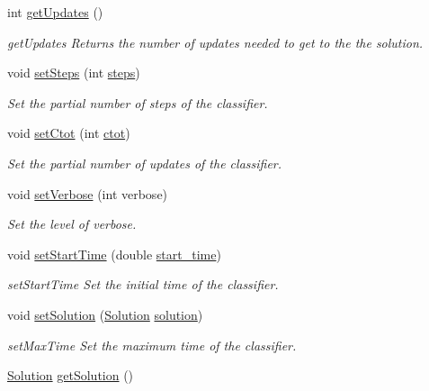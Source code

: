 \begin{DoxyCompactItemize}
int \hyperlink{class_classifier_a738c2fbed982db6cad02062edcc037e4}{get\+Updates} ()
\begin{DoxyCompactList}\small\item\em get\+Updates Returns the number of updates needed to get to the the solution. \end{DoxyCompactList}\item 
void \hyperlink{class_classifier_a779b6cac0351e272ee0573d919d5d060}{set\+Steps} (int \hyperlink{class_classifier_a1e4c9c9ba059d5aff1d4d81eb41725cb}{steps})
\begin{DoxyCompactList}\small\item\em Set the partial number of steps of the classifier. \end{DoxyCompactList}\item 
void \hyperlink{class_classifier_a3293d7d39c3934503a23b920f84f73e7}{set\+Ctot} (int \hyperlink{class_classifier_a99d9a7f504212bb3dc2726c10a2333c6}{ctot})
\begin{DoxyCompactList}\small\item\em Set the partial number of updates of the classifier. \end{DoxyCompactList}\item 
void \hyperlink{class_classifier_a073b94029512378ccfae3aa34aae0212}{set\+Verbose} (int verbose)
\begin{DoxyCompactList}\small\item\em Set the level of verbose. \end{DoxyCompactList}\item 
void \hyperlink{class_classifier_a7f1cf3ac53b0593307a050368a912bb4}{set\+Start\+Time} (double \hyperlink{class_classifier_a4488a20bd7b4fc22d57244aaee57b002}{start\+\_\+time})
\begin{DoxyCompactList}\small\item\em set\+Start\+Time Set the initial time of the classifier. \end{DoxyCompactList}\item 
void \hyperlink{class_classifier_aef6cb633eed60712f8948a404f630e82}{set\+Solution} (\hyperlink{class_solution}{Solution} \hyperlink{class_classifier_a8e70651d36fa396f55028847acd6ae50}{solution})
\begin{DoxyCompactList}\small\item\em set\+Max\+Time Set the maximum time of the classifier. \end{DoxyCompactList}\item 
\hyperlink{class_solution}{Solution} \hyperlink{class_classifier_afd2b54ada10af9f4be1c4d326b180dc7}{get\+Solution} ()

\end{DoxyCompactItemize}
